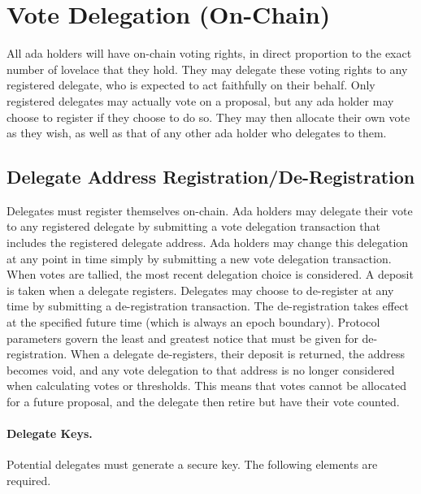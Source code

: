 \newpage
\section{Vote Delegation (On-Chain)}
\label{sect:delegation}

All ada holders will have on-chain voting rights, in direct proportion to the exact number of lovelace that they hold.
They may delegate these voting rights to any registered delegate, who is expected to act faithfully on their behalf.
Only registered delegates may actually vote on a proposal, but any ada holder may choose to register if they choose to do so.
They may then allocate their own vote as they wish, as well as that of any other ada holder who delegates to them.


\subsection{Delegate Address Registration/De-Registration}
\label{sect:registration}

Delegates must register themselves on-chain.  Ada holders may delegate their
vote to any registered delegate by submitting a vote delegation transaction that includes the registered delegate address.
Ada holders may change this delegation at any point in time simply by submitting a new vote delegation transaction.  When votes are tallied, the most recent delegation choice is considered.
A deposit is taken when a delegate registers.  Delegates may choose to de-register at any time by submitting a de-registration transaction.  The de-registration takes effect
at the specified future time (which is always an epoch boundary).  Protocol parameters govern the least and greatest notice that must be given for de-registration.  When a delegate de-registers, their deposit is returned,
the address becomes void, and any vote delegation to that address is no longer considered when calculating votes or thresholds.  This means that votes cannot be allocated for a future proposal, and the delegate then
retire but have their vote counted.

\paragraph{Delegate Keys.} Potential delegates must generate a secure key. The following elements are required.

